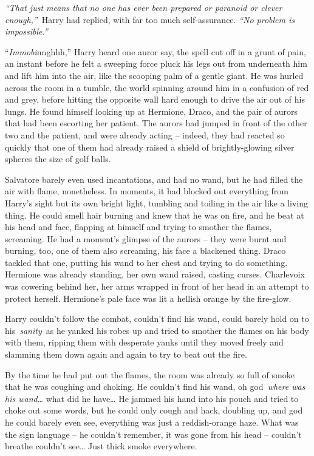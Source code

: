 \emph{``That just means that no one has ever been prepared or paranoid
or clever enough,''}~Harry had replied, with far too much
self-assurance. \emph{``No problem is impossible.''}

``\emph{Immobi}nnghhh,'' Harry heard one auror say, the spell cut off in
a grunt of pain, an instant before he felt a sweeping force pluck his
legs out from underneath him and lift him into the air, like the
scooping palm of a gentle giant. He was hurled across the room in a
tumble, the world spinning around him in a confusion of red and grey,
before hitting the opposite wall hard enough to drive the air out of his
lungs. He found himself looking up at Hermione, Draco, and the pair of
aurors that had been escorting her patient. The aurors had jumped in
front of the other two and the patient, and were already acting --
indeed, they had reacted so quickly that one of them had already raised
a shield of brightly-glowing silver spheres the size of golf balls.

Salvatore barely even used incantations, and had no wand, but he had
filled the air with flame, nonetheless. In moments, it had blocked out
everything from Harry's sight but its own bright light, tumbling and
toiling in the air like a living thing. He could smell hair burning and
knew that he was on fire, and he beat at his head and face, flapping at
himself and trying to smother the flames, screaming. He had a moment's
glimpse of the aurors -- they were burnt and burning, too, one of them
also screaming, his face a blackened thing. Draco tackled that one,
putting his wand to her chest and trying to do something. Hermione was
already standing, her own wand raised, casting curses. Charlevoix was
cowering behind her, her arms wrapped in front of her head in an attempt
to protect herself. Hermione's pale face was lit a hellish orange by the
fire-glow.

Harry couldn't follow the combat, couldn't find his wand, could barely
hold on to his~\emph{sanity}~as he yanked his robes up and tried to
smother the flames on his body with them, ripping them with desperate
yanks until they moved freely and slamming them down again and again to
try to beat out the fire.

By the time he had put out the flames, the room was already so full of
smoke that he was coughing and choking. He couldn't find his wand, oh
god~\emph{where was his wand}\ldots{} what did he have\ldots{} He jammed
his hand into his pouch and tried to choke out some words, but he could
only cough and hack, doubling up, and god he could barely even see,
everything was just a reddish-orange haze. What was the sign language --
he couldn't remember, it was gone from his head -- couldn't breathe
couldn't see\ldots{} Just thick smoke everywhere.

